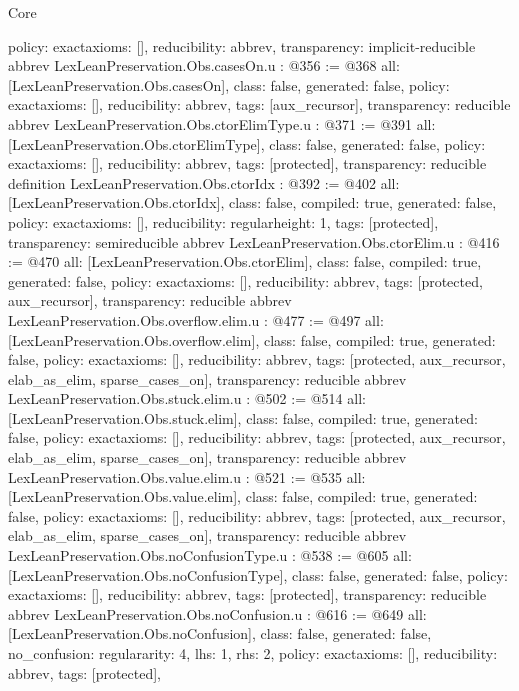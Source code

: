 \begin{lexlean}{Core}
\begin{coremodule}
{  policy: exact{axioms: []},
  reducibility: abbrev{},
  transparency: implicit-reducible
}
abbrev LexLeanPreservation.Obs.casesOn.{u} : @356 := @368 {
  all: [LexLeanPreservation.Obs.casesOn],
  class: false,
  generated: false,
  policy: exact{axioms: []},
  reducibility: abbrev{},
  tags: [aux_recursor],
  transparency: reducible
}
abbrev LexLeanPreservation.Obs.ctorElimType.{u} : @371 := @391 {
  all: [LexLeanPreservation.Obs.ctorElimType],
  class: false,
  generated: false,
  policy: exact{axioms: []},
  reducibility: abbrev{},
  tags: [protected],
  transparency: reducible
}
definition LexLeanPreservation.Obs.ctorIdx : @392 := @402 {
  all: [LexLeanPreservation.Obs.ctorIdx],
  class: false,
  compiled: true,
  generated: false,
  policy: exact{axioms: []},
  reducibility: regular{height: 1},
  tags: [protected],
  transparency: semireducible
}
abbrev LexLeanPreservation.Obs.ctorElim.{u} : @416 := @470 {
  all: [LexLeanPreservation.Obs.ctorElim],
  class: false,
  compiled: true,
  generated: false,
  policy: exact{axioms: []},
  reducibility: abbrev{},
  tags: [protected, aux_recursor],
  transparency: reducible
}
abbrev LexLeanPreservation.Obs.overflow.elim.{u} : @477 := @497 {
  all: [LexLeanPreservation.Obs.overflow.elim],
  class: false,
  compiled: true,
  generated: false,
  policy: exact{axioms: []},
  reducibility: abbrev{},
  tags: [protected, aux_recursor, elab_as_elim, sparse_cases_on],
  transparency: reducible
}
abbrev LexLeanPreservation.Obs.stuck.elim.{u} : @502 := @514 {
  all: [LexLeanPreservation.Obs.stuck.elim],
  class: false,
  compiled: true,
  generated: false,
  policy: exact{axioms: []},
  reducibility: abbrev{},
  tags: [protected, aux_recursor, elab_as_elim, sparse_cases_on],
  transparency: reducible
}
abbrev LexLeanPreservation.Obs.value.elim.{u} : @521 := @535 {
  all: [LexLeanPreservation.Obs.value.elim],
  class: false,
  compiled: true,
  generated: false,
  policy: exact{axioms: []},
  reducibility: abbrev{},
  tags: [protected, aux_recursor, elab_as_elim, sparse_cases_on],
  transparency: reducible
}
abbrev LexLeanPreservation.Obs.noConfusionType.{u} : @538 := @605 {
  all: [LexLeanPreservation.Obs.noConfusionType],
  class: false,
  generated: false,
  policy: exact{axioms: []},
  reducibility: abbrev{},
  tags: [protected],
  transparency: reducible
}
abbrev LexLeanPreservation.Obs.noConfusion.{u} : @616 := @649 {
  all: [LexLeanPreservation.Obs.noConfusion],
  class: false,
  generated: false,
  no_confusion: regular{arity: 4, lhs: 1, rhs: 2},
  policy: exact{axioms: []},
  reducibility: abbrev{},
  tags: [protected],
}
\end{coremodule}
\end{lexlean}
